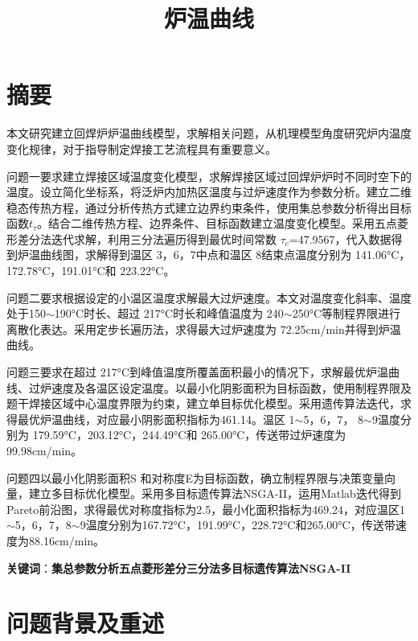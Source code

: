 \documentclass[a4paper,12pt]{ctexart} %
\begin{document}
	\title{炉温曲线\vspace{-3em}}
	\date{}
	\maketitle
	\section*{摘要}
	本文研究建立回焊炉炉温曲线模型，求解相关问题，从机理模型角度研究炉内温度变化规律，对于指导制定焊接工艺流程具有重要意义。\par
	问题一要求建立焊接区域温度变化模型，求解焊接区域过回焊炉炉时不同时空下的温度。设立简化坐标系，将泛炉内加热区温度与过炉速度作为参数分析。建立二维稳态传热方程，通过分析传热方式建立边界约束条件，使用集总参数分析得出目标函数$t_\tau$。结合二维传热方程、边界条件、目标函数建立温度变化模型。采用五点菱形差分法迭代求解，利用三分法遍历得到最优时间常数 $\tau_c$=47.9567，代入数据得到炉温曲线图，求解得到温区 3，6，7中点和温区 8结束点温度分别为 141.06°C，172.78°C，191.01°C和 223.22°C。\par
	问题二要求根据设定的小温区温度求解最大过炉速度。本文对温度变化斜率、温度处于150$\sim$190°C时长、超过 217°C时长和峰值温度为 240$\sim$250°C等制程界限进行离散化表达。采用定步长遍历法，求得最大过炉速度为 72.25cm/min并得到炉温曲线。\par
	问题三要求在超过 217°C到峰值温度所覆盖面积最小的情况下，求解最优炉温曲线、过炉速度及各温区设定温度。以最小化阴影面积为目标函数，使用制程界限及题干焊接区域中心温度界限为约束，建立单目标优化模型。采用遗传算法迭代，求得最优炉温曲线，对应最小阴影面积指标为461.14。温区 1$\sim$5，6，7， 8$\sim$9温度分别为 179.59°C，203.12°C，244.49°C和 265.00°C，传送带过炉速度为99.98cm/min。\par
	问题四以最小化阴影面积S 和对称度E为目标函数，确立制程界限与决策变量向量，建立多目标优化模型。采用多目标遗传算法NSGA-II，运用Matlab迭代得到Pareto前沿图，求得最优对称度指标为2.5，最小化面积指标为469.24，对应温区1$\sim$5，6，7，8$\sim$9温度分别为167.72°C，191.99°C，228.72°C和265.00°C，传送带速度为88.16cm/min。\par
	\noindent\textbf{关键词}：\textbf{集总参数分析}\quad  \textbf{五点菱形差分}\quad   \textbf{三分法}\quad \textbf{多目标遗传算法NSGA-II}\quad
	\newpage
	\section{问题背景及重述}
\end{document}
